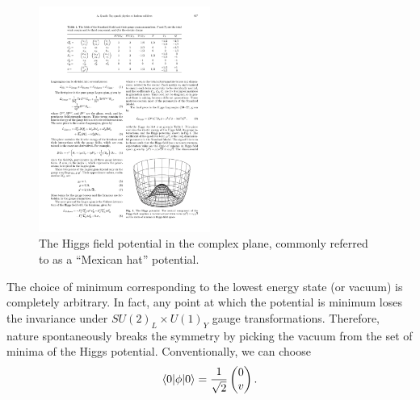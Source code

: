 \begin{figure}[!hbtp]
\centering
\includegraphics[width=0.5\textwidth]{Higgs_potential}
\caption[The Higgs field potential.]{The Higgs field potential in the complex plane, commonly referred to as a
``Mexican hat'' potential.}
\label{fig:higgs_potential}
\end{figure}

The choice of minimum corresponding to the lowest energy state (or vacuum) is completely arbitrary. In fact, any point
at which the potential is minimum loses the invariance under $SU(2)_L \times U(1)_Y$ gauge transformations. Therefore,
nature spontaneously breaks the symmetry by picking the vacuum from the set of minima of the Higgs potential.
Conventionally, we can choose
\begin{equation}
\langle 0 | \phi | 0 \rangle = \frac{1}{\sqrt{2}} \begin{pmatrix} 0 \\ v \end{pmatrix}.
\label{eq:unitary_gauge_vev}
\end{equation}

